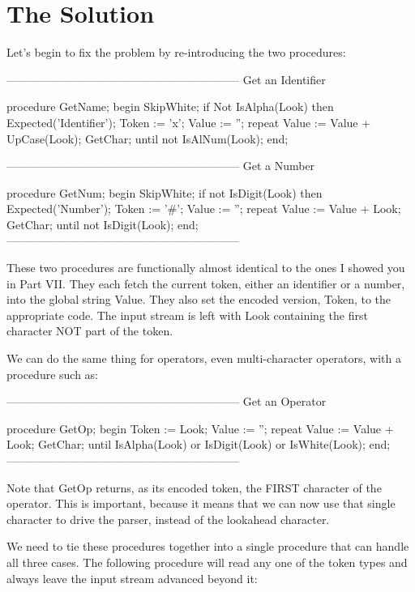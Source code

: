 \documentclass[float=false, crop=false]{standalone}
\begin{document}
\section{The Solution}

Let's begin to fix the problem by re-introducing the two procedures:

\begin{code}
{--------------------------------------------------------------}
{ Get an Identifier }

procedure GetName;
begin
   SkipWhite;
   if Not IsAlpha(Look) then Expected('Identifier');
   Token := 'x';
   Value := '';
   repeat
      Value := Value + UpCase(Look);
      GetChar;
   until not IsAlNum(Look);
end;


{--------------------------------------------------------------}
{ Get a Number }

procedure GetNum;
begin
   SkipWhite;
   if not IsDigit(Look) then Expected('Number');
   Token := '#';
   Value := '';
   repeat
      Value := Value + Look;
      GetChar;
   until not IsDigit(Look);
end;
{--------------------------------------------------------------}
\end{code}

These two procedures are functionally almost identical to the ones I showed you
in Part VII. They each fetch the current token, either an identifier or a
number, into the global string Value. They also set the encoded version, Token,
to the appropriate code. The input stream is left with Look containing the first
character NOT part of the token.

We can do the same thing for operators, even multi-character operators, with a
procedure such as:

\begin{code}
{--------------------------------------------------------------}
{ Get an Operator }

procedure GetOp;
begin
   Token := Look;
   Value := '';
   repeat
      Value := Value + Look;
      GetChar;
   until IsAlpha(Look) or IsDigit(Look) or IsWhite(Look);
end;
{--------------------------------------------------------------}
\end{code}

Note that GetOp returns, as its encoded token, the FIRST character of the
operator. This is important, because it means that we can now use that single
character to drive the parser, instead of the lookahead character.

We need to tie these procedures together into a single procedure that can handle
all three cases. The following procedure will read any one of the token types
and always leave the input stream advanced beyond it:
\end{document}
